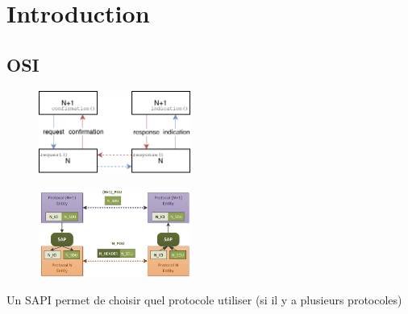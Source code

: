 \documentclass[resume]{subfiles}
\begin{document}
\section{Introduction}
\subsection{OSI}

\begin{figure}[H]
\centering
\includegraphics[width=5cm,page=1]{Schemas-crop.pdf}
\end{figure}
\begin{figure}[H]
\centering
\includegraphics[width=5cm,page=1]{img_1.png}
\end{figure}
Un SAPI permet de choisir quel protocole utiliser (si il y a plusieurs protocoles)
\end{document}
